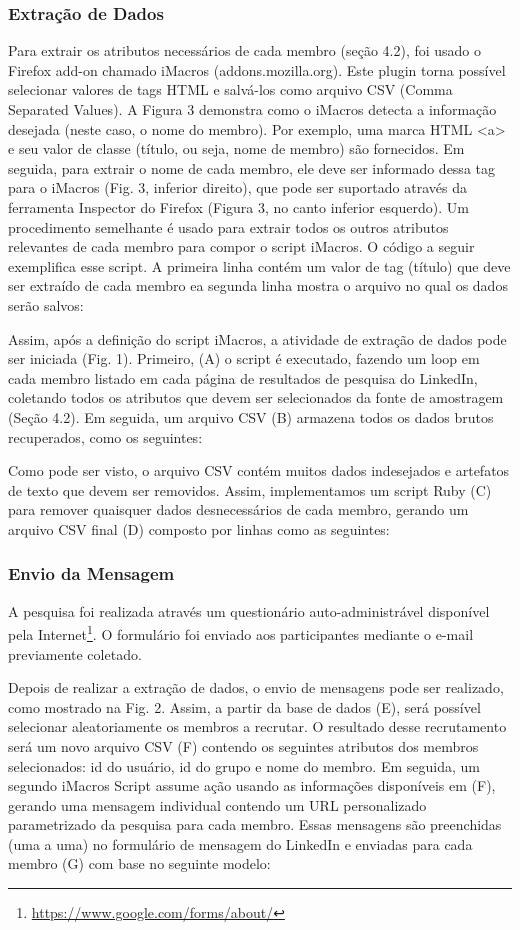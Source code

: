 \subsubsection{Extração de Dados}

Para extrair os atributos necessários de cada membro (seção 4.2), foi usado o
Firefox add-on chamado iMacros (addons.mozilla.org). Este plugin torna possível
selecionar valores de tags HTML e salvá-los como arquivo CSV (Comma Separated
Values). A Figura 3 demonstra como o iMacros detecta a informação desejada
(neste caso, o nome do membro).
Por exemplo, uma marca HTML <a> e seu valor de classe (título, ou seja, nome de
membro) são fornecidos. Em seguida, para extrair o nome de cada membro, ele deve
ser informado dessa tag para o iMacros (Fig. 3, inferior direito), que pode ser
suportado através da ferramenta Inspector do Firefox (Figura 3, no canto
inferior esquerdo). Um procedimento semelhante é usado para extrair todos os
outros atributos relevantes de cada membro para compor o script iMacros. O
código a seguir exemplifica esse script. A primeira linha contém um valor de tag
(título) que deve ser extraído de cada membro ea segunda linha mostra o arquivo
no qual os dados serão salvos:

Assim, após a definição do script iMacros, a atividade de extração de dados pode
ser iniciada (Fig. 1). Primeiro, (A) o script é executado, fazendo um loop em
cada membro listado em cada página de resultados de pesquisa do LinkedIn,
coletando todos os atributos que devem ser selecionados da fonte de amostragem
(Seção 4.2). Em seguida, um arquivo CSV (B) armazena todos os dados brutos
recuperados, como os seguintes:

Como pode ser visto, o arquivo CSV contém muitos dados indesejados e artefatos
de texto que devem ser removidos. Assim, implementamos um script Ruby (C) para
remover quaisquer dados desnecessários de cada membro, gerando um arquivo CSV
final (D) composto por linhas como as seguintes:

\subsubsection{Envio da Mensagem}

A pesquisa foi realizada através um questionário auto-administrável disponível
pela Internet\footnote{\url{https://www.google.com/forms/about/}}. O formulário
foi enviado aos participantes mediante o e-mail previamente coletado.

Depois de realizar a extração de dados, o envio de mensagens pode ser
realizado, como mostrado na Fig. 2. Assim, a partir da base de dados (E), será
possível selecionar aleatoriamente os membros a recrutar. O resultado desse
recrutamento será um novo arquivo CSV (F) contendo os seguintes atributos dos
membros selecionados: id do usuário, id do grupo e nome do membro. Em seguida,
um segundo iMacros Script assume ação usando as informações disponíveis em (F),
gerando uma mensagem individual contendo um URL personalizado parametrizado da
pesquisa para cada membro. Essas mensagens são preenchidas (uma a uma) no
formulário de mensagem do LinkedIn e enviadas para cada membro (G) com base no
seguinte modelo:

